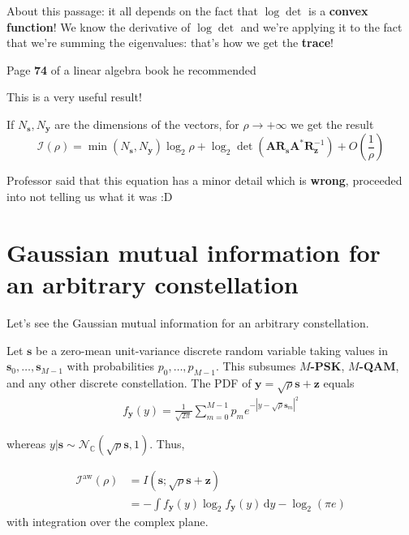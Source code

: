 \documentclass[a4paper, 11pt]{book}
\begin{document}
About this passage: it all depends on the fact that $\log \det$ is a \textbf{convex function}! We know the derivative of $\log \det$ and we're applying it to the fact that we're summing the eigenvalues: that's how we get the \textbf{trace}!

\begin{tcolorbox}[frame empty, sharp corners, boxrule=0pt, leftrule=2pt, colframe=green!60!black, colback=green!10, left=5pt, top=3pt, bottom=3pt]
    Page \textbf{74} of a linear algebra book he recommended
\end{tcolorbox}

This is a very useful result!

If $N_{\bm{s}}, N_{\bm{y}}$ are the dimensions of the vectors, for $\rho \to +\infty$ we get the result
$$
\mathcal{I}(\rho) = \min(N_{\bm{s}}, N_{\bm{y}}) \log_2 \rho + \log_2 \det(\bm{A}\bm{R}_{\bm{s}}\bm{A}^*\bm{R}_{\bm{z}}^{-1}) + O\left(\frac{1}{\rho}\right)
$$

\begin{tcolorbox}[frame empty, sharp corners, boxrule=0pt, leftrule=2pt, colframe=green!60!black, colback=green!10, left=5pt, top=3pt, bottom=3pt]
    Professor said that this equation has a minor detail which is \textbf{wrong}, proceeded into not telling us what it was :D
\end{tcolorbox}

\section[Gaussian mutual info arbitrary const.]{Gaussian mutual information for an arbitrary constellation}

Let's see the Gaussian mutual information for an arbitrary constellation.

Let $\bm{s}$ be a zero-mean unit-variance discrete random variable taking values in $\bm{s}_0, \ldots, \bm{s}_{M-1}$ with probabilities $p_0, \ldots, p_{M-1}$. This subsumes \textbf{$M$-PSK}, \textbf{$M$-QAM}, and any other discrete constellation. The PDF of $\bm{y} = \sqrt{\rho}\bm{s} + \bm{z}$ equals
\begin{align}
f_{\bm{y}}(y) = \frac{1}{\sqrt{2\pi}} \sum_{m=0}^{M-1} p_m e^{-|y-\sqrt{\rho}\bm{s}_m|^2} \tag{1.65v}
\end{align}

whereas $y|\bm{s} \sim \mathcal{N}_{\mathbb{C}}( \sqrt{\rho}\bm{s}, 1)$. Thus,

\begin{align}
\mathcal{I}^{\text{aw}}(\rho) &= I(\bm{s}; \sqrt{\rho}\bm{s} + \bm{z}) \tag{1.66} \\
&= -\int f_{\bm{y}}(y) \log_2 f_{\bm{y}}(y) \, \mathrm{d}y - \log_2(\pi e) \tag{1.67}
\end{align}
with integration over the complex plane.
\end{document}
